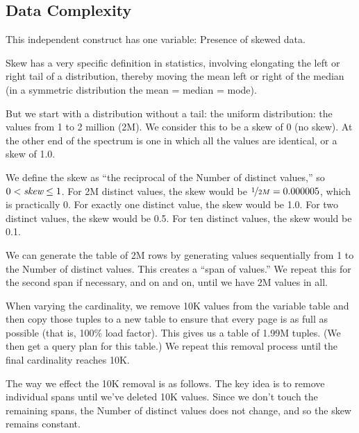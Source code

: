 \documentclass[prodmode,acmtods]{acmsmall}
\begin{document}
\subsection{Data Complexity}\label{sec:datacomplexity}
This independent construct has one variable: Presence of skewed data.

Skew has a very specific definition in statistics, 
involving elongating the left or right tail of a distribution, 
thereby moving the mean left or right of the median 
(in a symmetric distribution the mean = median = mode).

But we start with a distribution without a tail: 
the uniform distribution: the values from 1 to 2 million (2M). 
We consider this to be a skew of 0 (no skew). 
At the other end of the spectrum is one in which all the values are identical, 
or a skew of 1.0.

We define the skew as ``the reciprocal of the Number of distinct
values,'' so $0 < \hbox{\em skew} \leq 1$.
For 2M distinct values, the skew would be $\nicefrac{1}{2M}= 0.000005$, which is practically 0. 
For exactly one distinct value, the skew would be 1.0. For two distinct values, 
the skew would be 0.5. For ten distinct values, the skew would be 0.1.

We can generate the table of 2M rows by generating values sequentially from
1 to the Number of distinct values.  This creates a ``span of values.'' We
repeat this for the second span if necessary, and on and on, until we have
2M values in all.

When varying the cardinality, we remove 10K values from the variable table
and then copy those tuples to a new table to ensure that every page is as
full as possible (that is, 100\% load factor).  This gives us a table of
1.99M tuples. (We then get a query plan for this table.)  We repeat this
removal process until the final cardinality reaches 10K.

The way we effect the 10K removal is as follows. 
The key idea is to remove individual spans until we've deleted 10K
values. Since we don't touch the remaining spans, the Number of distinct
values does not change, and so the skew remains constant.
\end{document}
